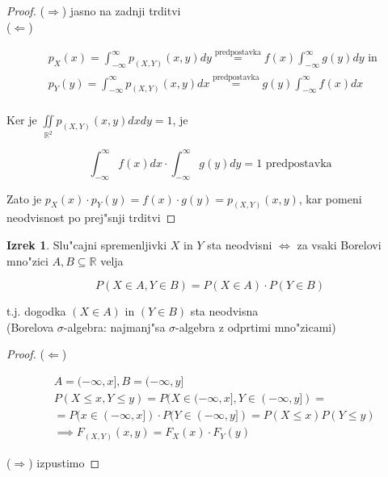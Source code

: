 \documentclass[a4paper,12pt]{article}
\theoremstyle{definition}
\newtheorem{theorem}[counter]{Izrek}
\theoremstyle{remark}
\newcommand{\R}{\mathbb{R}}
\begin{document}
\begin{proof}
    ($\Rightarrow$) jasno na zadnji trditvi \\
    ($\Leftarrow$)

    \begin{align*}
        &p_X(x) = \int_{-\infty}^{\infty} p_{(X,Y)}(x,y) dy \stackrel{\text{predpostavka}}{=}
            f(x) \int_{-\infty}^{\infty} g(y) dy \text{ in } \\
        &p_Y(y) = \int_{-\infty}^{\infty} p_{(X,Y)}(x,y) dx \stackrel{\text{predpostavka}}{=}
            g(y) \int_{-\infty}^{\infty} f(x) dx \\
    \end{align*}

    Ker je $\iint\limits_{\R^2} p_{(X,Y)}(x,y) dx dy = 1$, je

    \begin{equation*}
        \int_{-\infty}^{\infty} f(x) dx \cdot \int_{-\infty}^{\infty} g(y) dy = 1 \text{ predpostavka}
    \end{equation*}

    Zato je $p_X(x) \cdot p_Y(y) = f(x) \cdot g(y) = p_{(X,Y)}(x,y)$, kar pomeni neodvisnost po prej"snji trditvi
\end{proof}

\begin{theorem}
    Slu"cajni spremenljivki $X$ in $Y$ sta neodvisni $\iff$ za vsaki Borelovi mno"zici $A, B \subseteq \R$ velja

    \begin{equation*}
        P(X \in A, Y \in B) = P(X \in A) \cdot P(Y \in B)
    \end{equation*}

    t.j. dogodka $(X \in A)$ in $(Y \in B)$ sta neodvisna \\
    (Borelova $\sigma$-algebra: najmanj"sa $\sigma$-algebra z odprtimi mno"zicami)
\end{theorem}

\begin{proof}
    ($\Leftarrow$)

    \begin{align*}
        &A = (-\infty, x], B = (-\infty, y] \\
        &P(X \leq x, Y \leq y) = P(X \in (-\infty, x], Y \in (-\infty, y]) = \\
        &= P(x \in (-\infty, x]) \cdot P(Y \in (-\infty, y]) = P(X \leq x) P(Y \leq y) \\
        &\implies F_{(X,Y)}(x,y) = F_X(x) \cdot F_Y(y)
    \end{align*}

    ($\Rightarrow$) izpustimo
\end{proof}
\end{document}
